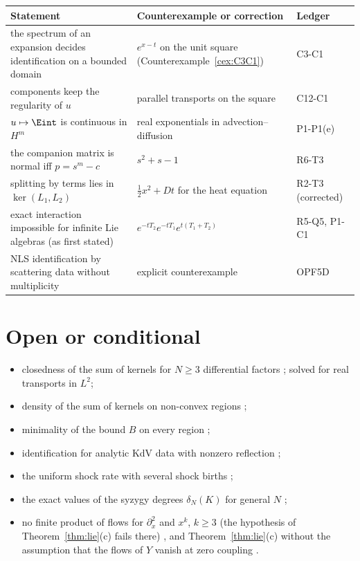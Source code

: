 \begin{center}\small
\begin{tabular}{@{}L{5.2cm}L{6.0cm}L{2.6cm}@{}}
\toprule
Statement & Counterexample or correction & Ledger\\\midrule
the spectrum of an expansion decides identification on a bounded domain & $e^{x-t}$ on the unit square (Counterexample~\ref{cex:C3C1}) & C3-C1\\
components keep the regularity of $u$ & parallel transports on the square & C12-C1\\
$u\mapsto\Eint$ is continuous in $H^m$ & real exponentials in advection--diffusion & P1-P1(e)\\
the companion matrix is normal iff $p=s^m-c$ & $s^2+s-1$ & R6-T3\\
splitting by terms lies in $\ker(L_1,L_2)$ & $\tfrac12x^2+Dt$ for the heat equation & R2-T3 (corrected)\\
exact interaction impossible for infinite Lie algebras (as first stated) & $e^{-tT_2}e^{-tT_1}e^{t(T_1+T_2)}$ & R5-Q5, P1-C1\\
NLS identification by scattering data without multiplicity & explicit counterexample & OPF5D\\\bottomrule
\end{tabular}
\end{center}

\section{Open or conditional}

\begin{itemize}
\item closedness of the sum of kernels for $N\ge3$ differential factors \openq{} ; solved for real transports in $L^2$;
\item density of the sum of kernels on non-convex regions \openq;
\item minimality of the bound $B$ on every region \openq{} ;
\item identification for analytic KdV data with nonzero reflection \openq{} ;
\item the uniform shock rate with several shock births \condl{} ;
\item the exact values of the syzygy degrees $\delta_N(K)$ for general $N$ \openq{} ;
\item no finite product of flows for $\partial_x^2$ and $x^k$, $k\ge3$ (the hypothesis of Theorem~\ref{thm:lie}(c) fails there) \openq{} , and Theorem~\ref{thm:lie}(c) without the assumption that the flows of $Y$ vanish at zero coupling \openq{} .
\end{itemize}

